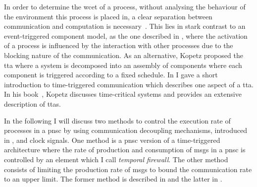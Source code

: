 In order to determine the \gls{wcet} of a process, without analysing the behaviour of the environment this process is placed in, a clear separation between communication and computation is necessary~\cite{kopetz2011b}.
This lies in stark contrast to an event-triggered component model, as the one described in \Chap{\ref{chap_ecm}}, where the activation of a process is influenced by the interaction with other processes due to the blocking nature of the communication.
As an alternative, Kopetz proposed the \gls{tta} where a system is decomposed into an assembly of components where each component is triggered according to a fixed schedule.
In \Sect{\ref{sect_background_com}} I gave a short introduction to time-triggered communication which describes one aspect of a \gls{tta}.
In his book~\cite{kopetz2011}, Kopetz discusses time-critical systems and provides an extensive description of \glspl{tta}.

In the following I will discuss two methods to control the execution rate of processes in a \gls{pnsc} by using communication decoupling mechanisms, introduced in \Sect{\ref{sect_cci_decoupling}}, and clock signals.
One method is a \gls{pnsc} version of a time-triggered architecture where the rate of production and consumption of \glspl*{msg} in a \gls{pnsc} is controlled by an element which I call \emph{temporal firewall}.
The other method consists of limiting the production rate of \glspl*{msg} to bound the communication rate to an upper limit.
The former method is described in \SSect{\ref{sect_tcm_time_tt}} and the latter in \SSect{\ref{sect_cci_decoupling_rate}}.

